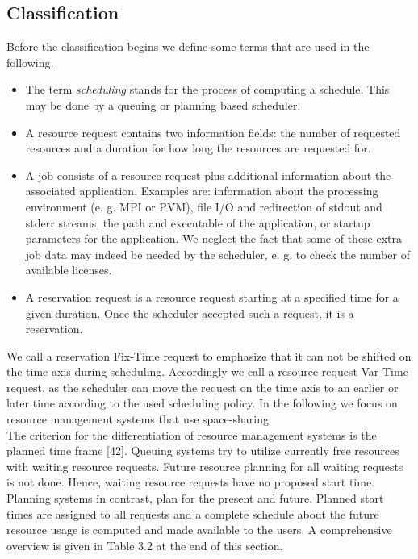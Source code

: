 \subsection{Classification}
Before the classification begins we define some terms that are used in the following.
\begin{itemize}
\item The term \textit{scheduling} stands for the process of computing a schedule. This may be done by a queuing or planning based scheduler.
\item A resource request contains two information fields: the number of requested resources and a duration for how long the resources are requested for.
\item A job consists of a resource request plus additional information about the associated application. Examples are: information about the processing environment (e. g. MPI or PVM), file I/O and redirection of stdout and stderr streams, the path and executable of the application, or startup parameters for the application. We neglect the fact that some of these extra job data may indeed be needed by the scheduler, e. g. to check the number of available licenses.
\item A reservation request is a resource request starting at a specified time for a given duration. Once the scheduler accepted such a request, it is a reservation.
\end{itemize}

We call a reservation Fix-Time request to emphasize that it can not be shifted on the time axis during scheduling. Accordingly we call a resource request Var-Time request, as the scheduler can move the request on the time axis to an earlier or later time according to the used scheduling policy. In the following we focus on resource management systems that use space-sharing.\\

The criterion for the differentiation of resource management systems is the planned time frame [42]. Queuing systems try to utilize currently free resources with waiting resource requests. Future resource planning for all waiting requests is not done. Hence, waiting resource requests have no proposed start time. Planning systems in contrast, plan for the present and future. Planned start times are assigned to all requests and a complete schedule about the future resource usage is computed and made available to the users. A comprehensive overview is given in Table 3.2 at the end of this section.\\

